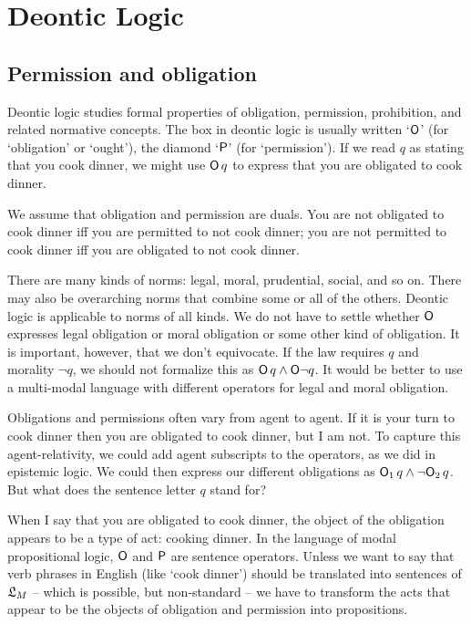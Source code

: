 \chapter{Deontic Logic}\label{ch:deontic}

\section{Permission and obligation}

Deontic logic studies formal properties of obligation, permission, prohibition,
and related normative concepts. The box in deontic logic is usually written
`$\operatorname{\mathsf{O}}$' (for `obligation' or `ought'), the diamond `$\operatorname{\mathsf{P}}$' (for `permission').
If we read $q$ as stating that you cook dinner, we might use $\operatorname{\mathsf{O}} q$ to express
that you are obligated to cook dinner.

We assume that obligation and permission are duals. You are not obligated to
cook dinner iff you are permitted to not cook dinner; you are not permitted to
cook dinner iff you are obligated to not cook dinner.

There are many kinds of norms: legal, moral, prudential, social, and so on. There may also be overarching norms that combine some
or all of the others. Deontic logic is applicable to norms of all kinds. We do
not have to settle whether $\operatorname{\mathsf{O}}$ expresses legal obligation or moral obligation
or some other kind of obligation. It is important, however, that we don't
equivocate. If the law requires $q$ and morality $\neg q$, we should not
formalize this as $\operatorname{\mathsf{O}} q \land \operatorname{\mathsf{O}}\! \neg q$. It would be better to use a
multi-modal language with different operators for legal and moral obligation.


Obligations and permissions often vary from agent to agent. If it is your turn
to cook dinner then you are obligated to cook dinner, but I am not. To capture
this agent-relativity, we could add agent subscripts to the operators, as we did
in epistemic logic. We could then express our different obligations as
$\operatorname{\mathsf{O}}_1 q \land \neg \!\operatorname{\mathsf{O}}_2 q$. But what does the sentence letter $q$ stand for?

When I say that you are obligated to cook dinner, the object of the obligation
appears to be a type of act: cooking dinner. In the language of modal
propositional logic, $\operatorname{\mathsf{O}}$ and $\operatorname{\mathsf{P}}$ are sentence operators. Unless we want to
say that verb phrases in English (like `cook dinner') should be translated into
sentences of $\mathfrak{L}_M$ -- which is possible, but non-standard -- we have to
transform the acts that appear to be the objects of obligation and
permission into propositions.

